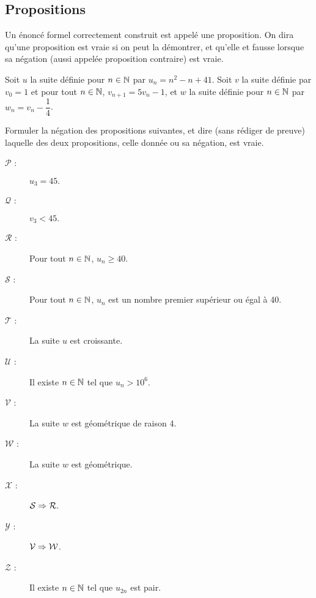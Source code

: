 \documentclass[a4paper,11pt,DIV18,BCOR0mm]{scrartcl}
\begin{document}
\subsection*{Propositions}
Un énoncé formel correctement construit est appelé une proposition.
On dira qu'une proposition est vraie si on peut la démontrer, et qu'elle et fausse 
lorsque sa négation (aussi appelée proposition contraire) est vraie.
\begin{exercice}
Soit $u$ la suite définie pour $n\in\mathbb{N}$ par $u_n=n^2-n+41$.
Soit $v$ la suite définie par $v_0=1$ et pour tout $n\in\mathbb{N}$, $v_{n+1}=5v_n-1$,
 et $w$ la suite définie pour $n\in\mathbb{N}$ par $w_n=v_n-\dfrac14$.

 Formuler la négation des propositions suivantes, et dire (sans rédiger de preuve)
laquelle des deux propositions, celle donnée ou sa négation, est vraie.
\begin{description}
 \item[$\mathcal{P}$ :]\og $u_3 = 45.$ \fg
 \item[$\mathcal{Q}$ :]\og $v_3 < 45.$ \fg
 \item[$\mathcal{R}$ :]\og Pour tout $n\in\mathbb{N}$, $u_n\geq40$.\fg
 \item[$\mathcal{S}$ :]\og Pour tout $n\in\mathbb{N}$, $u_n$ est un nombre premier supérieur ou égal à 40.\fg
 \item[$\mathcal{T}$ :]\og La suite $u$ est croissante.\fg
 \item[$\mathcal{U}$ :]\og Il existe $n\in\mathbb{N}$ tel que $u_n>10^6.$ \fg
 \item[$\mathcal{V}$ :]\og La suite $w$ est géométrique de raison 4.\fg
 \item[$\mathcal{W}$ :]\og La suite $w$ est géométrique.\fg
 \item[$\mathcal{X}$ :]\og $\mathcal{S}\Rightarrow\mathcal{R}$. \fg
 \item[$\mathcal{Y}$ :]\og $\mathcal{V}\Rightarrow\mathcal{W}$. \fg
 \item[$\mathcal{Z}$ :]\og Il existe $n\in\mathbb{N}$ tel que $u_{2n}$ est pair.\fg
\end{description}
\end{exercice}
\end{document}

